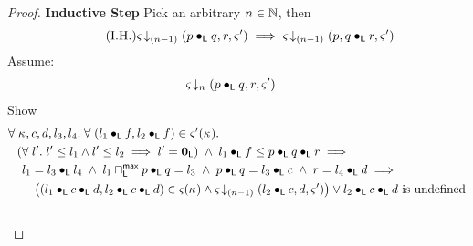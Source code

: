 \begin{lemma}
\begin{proof}
\noindent\textbf{Inductive Step} Pick an arbitrary $n \in \mathbb{N}$, then
%
\begin{equation}
	\tag{I.H.}
	\varsigma_{\!}\downarrow_{(n-1)} \left(p \bullet_{\textsf{L}} q, r, \varsigma_{}'\right) \implies 
	\varsigma_{\!}\downarrow_{(n-1)} \left(p, q \bullet_{\textsf{L}} r, \varsigma_{}'\right)
\label{L1:IH}
\end{equation}
%
Assume:
%
\begin{align}
	& \varsigma_{} \!\downarrow_{n} \left(p \bullet_{\textsf{L}} q, r, \varsigma_{}'\right) \label{L1:Ass1}
\end{align}
%
Show
%
\begin{align}
	&\for{\ca{}, c, d, l_3, l_4} \for{(l_1 \composeL f, l_2 \composeL f) \in \amod{}'(\ca{})} \nonumber\\
	&\hspace*{0.2cm}\left(\for{l'} l' \leq l_1 \land l' \leq l_2 \implies l' = \unitL\right)\;\land\; l_1 \composeL f \leq  p \composeL q \composeL r \implies \nonumber\\
	&\hspace*{0.4cm}  l_1 = l_3 \composeL l_4 \;\land\; l_1 \maxMeetL p \composeL q = l_3 \;\land\; p \composeL q = l_3 \composeL c \;\land\; r = l_4 \composeL d\implies \nonumber\\
	&\hspace*{0.7cm} \left((l_1 \composeL c \composeL d, l_2 \composeL c \composeL d) \in \amod{}(\ca{}) \land
	\extendsAMUpto{\amod}{(n-1)}{l_2 \composeL c}{d}{\amod{}'}\right) \lor l_2 \composeL c \composeL d \text{ is undefined} \label{L1:Goal1}\\ \nonumber\\
%
%	

\end{align}
\end{proof}
\end{lemma}
